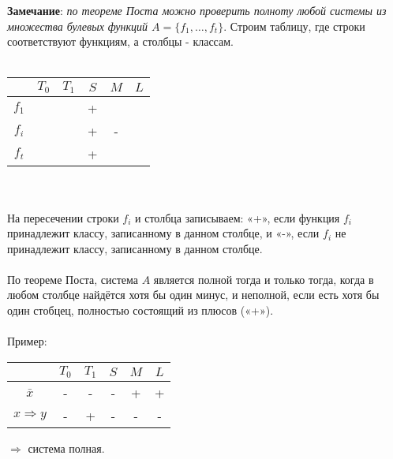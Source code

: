 \documentclass[a4paper, 12pt]{report}
\begin{document}
\textbf{Замечание}: \textit{по теореме Поста можно проверить полноту любой системы из множества булевых функций $A = \{f_1,\dotso, f_t\}$}. Строим таблицу, где строки соответствуют функциям, а столбцы - классам.\\\\
\begin{tabular}{|c|c|c|c|c|c|}
\hline
  & $T_0$ & $T_1$ & $S$ & $M$ & $L$\\
\hline
   $f_1$  &  &  & + &  &  \\
   $f_i$  &  &  & + & - &  \\
   $f_t$  &  &  & + &  &   \\
\hline
\end{tabular}\\\\			
На пересечении строки $f_i$ и столбца записываем: «+», если функция $f_i$ принадлежит классу, записанному в данном столбце, и «-»,  если $f_i$ не принадлежит классу, записанному в данном столбце.\\\\
По теореме Поста, система $A$ является полной тогда и только тогда, когда в любом столбце найдётся хотя бы один минус, и неполной, если есть хотя бы один стобцец, полностью состоящий из плюсов («+»).\\\\
Пример:\\
\begin{tabular}{|c|c|c|c|c|c|}
\hline
  & $T_0$ & $T_1$ & $S$ & $M$ & $L$\\
\hline
   $\bar x$ & - & - & - & + & + \\
   $x \Rightarrow y$ & - & + & - & - & - \\
\hline
\end{tabular} $\Rightarrow$ система полная.
\end{document}
